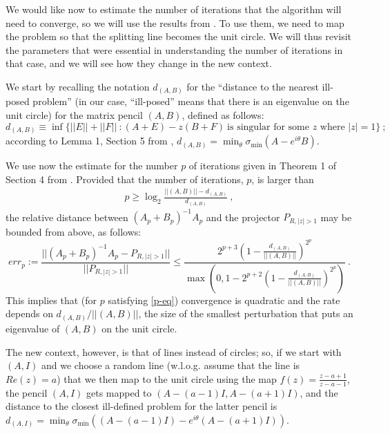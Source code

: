 \documentclass{article}
\theoremstyle{definition}
\begin{document}
We would like now to estimate the number of iterations that the algorithm will need to converge, so we will use the results from \cite{baidemmelgu94}. To use them, we need to map the problem so that the splitting line becomes the unit circle. We will thus revisit the parameters that were essential in understanding the number of iterations in that case, and we will see how they change in the new context.

We start by recalling the notation $d_{(A,B)}$ for the ``distance to the nearest ill-posed problem'' (in our case, ``ill-posed'' means that there is an eigenvalue on the unit circle) for the matrix pencil $(A, B)$, defined as follows:
\[
d_{(A,B)} \equiv \inf\{||E||+||F||~: (A+E) - z(B+F) ~\mbox{is singular for some $z$ where $|z|=1$}\}~;
\]
according to Lemma 1, Section 5 from \cite{baidemmelgu94}, $d_{(A,B)} = \min_{\theta} \sigma_{\min} (A - e^{i\theta}B)$. 

We use now the estimate for the number $p$ of iterations given in Theorem 1 of Section 4 from \cite{baidemmelgu94}. Provided that the number of iterations, $p$, is larger than 
\begin{eqnarray} \label{p-eq}
p \geq \log_2 \frac{||(A, B)|| - d_{(A,B)}}{d_{(A,B)}}~,
\end{eqnarray}
the relative distance between $(A_p+B_p)^{-1} A_p$ and the projector $P_{R, |z|>1}$ may be bounded from above, as follows:
\[
err_p := \frac{||(A_p+B_p)^{-1} A_p - P_{R, |z|>1}||}{||P_{R, |z|>1}||} \leq \frac{2^{p+3} \left ( 1 - \frac{d_{(A,B)}}{||(A,B)||} \right )^{2^p}}{\max \left ( 0, 1 - 2^{p+2} \left (1 - \frac{d_{(A,B)}}{||(A,B)||} \right )^{2^p} \right )}~.
\]
This implies that (for $p$ satisfying \eqref{p-eq}) convergence is quadratic and the rate depends on $d_{(A,B)}/||(A,B)||$, the size of the smallest perturbation that puts an eigenvalue of $(A, B)$ on the unit circle. 

The new context, however, is that of lines instead of circles; so, if we start with $(A,I)$ and we choose a random line (w.l.o.g. assume that the line is $Re(z) = a$) that we then map to the unit circle using the map $f(z) = \frac{z-a+1}{z-a-1}$, the pencil $(A, I)$ gets mapped to $(A-(a-1)I, A-(a+1)I)$, and the distance to the closest ill-defined problem for the latter pencil is $d_{(A,I)} = \min_{\theta} \sigma_{\min} ((A- (a-1)I) - e^{i \theta} (A-(a+1)I))$.
\end{document}
